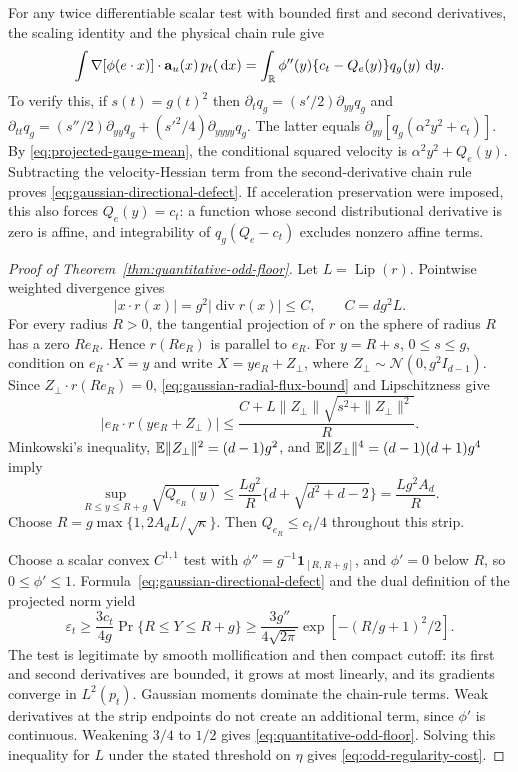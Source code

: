 For any twice differentiable scalar test with bounded first and second
derivatives, the scaling identity and the physical chain rule give
\begin{equation}
 \int\nabla[\phi(e\cdot x)]\cdot\mathbf a_u(x)\,p_t(\,\mathrm d x)
 =\int_{\mathbb R}\phi''(y)\{c_t-Q_e(y)\}q_g(y)\,\,\mathrm d y.
 \label{eq:gaussian-directional-defect}
\end{equation}
To verify this, if $s(t)=g(t)^2$ then
$\partial_tq_g=(s'/2)\partial_{yy}q_g$ and
$\partial_{tt}q_g=(s''/2)\partial_{yy}q_g+
(s'^2/4)\partial_{yyyy}q_g$.
The latter equals
$\partial_{yy}[q_g(\alpha^2y^2+c_t)]$.
By \eqref{eq:projected-gauge-mean}, the conditional squared velocity is
$\alpha^2y^2+Q_e(y)$.  Subtracting the velocity-Hessian term from
the second-derivative chain rule proves
\eqref{eq:gaussian-directional-defect}.  If acceleration preservation
were imposed, this also forces $Q_e(y)=c_t$: a function whose second
distributional derivative is zero is affine, and integrability of
$q_g(Q_e-c_t)$ excludes nonzero affine terms.

\begin{proof}[Proof of Theorem~\ref{thm:quantitative-odd-floor}]
Let $L=\operatorname{Lip}(r)$.  Pointwise weighted divergence gives
\begin{equation}
 |x\cdot r(x)|=g^2|\operatorname{div}r(x)|\le C,
 \qquad C=dg^2L.
 \label{eq:gaussian-radial-flux-bound}
\end{equation}
For every radius $R>0$, the tangential projection of $r$ on the sphere
of radius $R$ has a zero $Re_R$.  Hence $r(Re_R)$ is parallel to $e_R$.
For $y=R+s$, $0\le s\le g$, condition on $e_R\cdot X=y$ and write
$X=ye_R+Z_\perp$, where
$Z_\perp\sim\mathcal N(0,g^2I_{d-1})$.  Since
$Z_\perp\cdot r(Re_R)=0$, \eqref{eq:gaussian-radial-flux-bound} and
Lipschitzness give
\[
 |e_R\cdot r(ye_R+Z_\perp)|
 \le\frac{C+L\|Z_\perp\|\sqrt{s^2+\|Z_\perp\|^2}}{R}.
\]
Minkowski's inequality, $\mathbb E\|Z_\perp\|^2=(d-1)g^2$, and
$\mathbb E\|Z_\perp\|^4=(d-1)(d+1)g^4$ imply
\begin{equation}
 \sup_{R\le y\le R+g}\sqrt{Q_{e_R}(y)}
 \le\frac{Lg^2}{R}\{d+\sqrt{d^2+d-2}\}
 =\frac{Lg^2A_d}{R}.
 \label{eq:gaussian-pole-strip}
\end{equation}
Choose $R=g\max\{1,2A_dL/\sqrt\kappa\}$.  Then
$Q_{e_R}\le c_t/4$ throughout this strip.

Choose a scalar convex $C^{1,1}$ test with
$\phi''=g^{-1}\mathbf1_{[R,R+g]}$, and $\phi'=0$ below $R$, so
$0\le\phi'\le1$.  Formula~\eqref{eq:gaussian-directional-defect}
and the dual definition of the projected norm yield
\[
 \varepsilon_t\ge\frac{3c_t}{4g}\Pr\{R\le Y\le R+g\}
 \ge\frac{3g''}{4\sqrt{2\pi}}
       \exp[-(R/g+1)^2/2].
\]
The test is legitimate by smooth mollification and then compact cutoff:
its first and second derivatives are bounded, it grows at most linearly,
and its gradients converge in $L^2(p_t)$.  Gaussian moments dominate
the chain-rule terms.  Weak derivatives at the strip endpoints do not
create an additional term, since $\phi'$ is continuous.
Weakening $3/4$ to $1/2$ gives
\eqref{eq:quantitative-odd-floor}.  Solving this inequality for $L$
under the stated threshold on $\eta$ gives
\eqref{eq:odd-regularity-cost}.
\end{proof}

